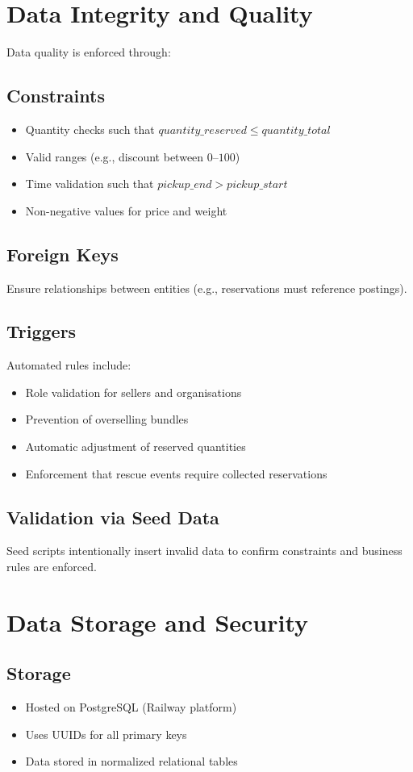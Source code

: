 \documentclass[12pt]{article}
\begin{document}
\section{Data Integrity and Quality}
Data quality is enforced through:

\subsection{Constraints}
\begin{itemize}
\item Quantity checks such that $quantity\_reserved \leq quantity\_total$
\item Valid ranges (e.g., discount between $0$--$100$)
\item Time validation such that $pickup\_end > pickup\_start$
\item Non-negative values for price and weight
\end{itemize}

\subsection{Foreign Keys}
Ensure relationships between entities (e.g., reservations must reference postings).

\subsection{Triggers}
Automated rules include:
\begin{itemize}
\item Role validation for sellers and organisations
\item Prevention of overselling bundles
\item Automatic adjustment of reserved quantities
\item Enforcement that rescue events require collected reservations
\end{itemize}

\subsection{Validation via Seed Data}
Seed scripts intentionally insert invalid data to confirm constraints and business rules are enforced.

\section{Data Storage and Security}
\subsection{Storage}
\begin{itemize}
\item Hosted on PostgreSQL (Railway platform)
\item Uses UUIDs for all primary keys
\item Data stored in normalized relational tables
\end{itemize}
\end{document}
